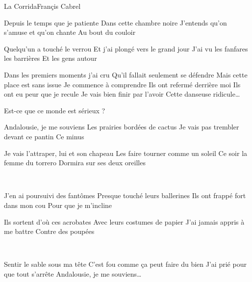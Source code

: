 \documentclass[a4paper,11pt,french]{article}
\begin{document}

\begin{Song}[Corrida]{La Corrida}{Françis Cabrel}
\begin{multicols}{2}

\begin{Verse}
Depuis le temps que je patiente
Dans cette chambre noire
J'entends qu'on s'amuse et qu'on chante
Au bout du couloir
\espaceInterStrophe

Quelqu'un a touché le verrou
Et j'ai plongé vers le grand jour
J'ai vu les fanfares les barrières
Et les gens autour
\end{Verse}
\espaceInterStrophe

\begin{Verse}
Dans les premiers moments j'ai cru
Qu'il fallait seulement se défendre
Mais cette place est sans issue
Je commence à comprendre
Ils ont refermé derrière moi
Ils ont eu peur que je recule
Je vais bien finir par l'avoir
Cette danseuse ridicule\dots
\end{Verse}
\espaceInterStrophe

\begin{Chorus}
Est-ce que ce monde est sérieux ? \bis
\end{Chorus}
\espaceInterStrophe

\begin{Verse}
Andalousie, je me souviens
Les prairies bordées de cactus
Je vais pas trembler devant ce pantin
Ce minus
\espaceInterStrophe

Je vais l'attraper, lui et son chapeau
Les faire tourner comme un soleil
Ce soir la femme du torrero
Dormira sur ses deux oreilles
\end{Verse}
\espaceInterStrophe

\aurefrain\\
\espaceInterStrophe

\begin{Bridge}
J'en ai poursuivi des fantômes
Presque touché leurs ballerines
Ils ont frappé fort dans mon cou
Pour que je m'incline
\espaceInterStrophe

Ils sortent d'où ces acrobates
Avec leurs costumes de papier
J'ai jamais appris à me battre
Contre des poupées
\end{Bridge}
\espaceInterStrophe

\aurefrain\\
\espaceInterStrophe

\begin{Verse}
Sentir le sable sous ma tête
C'est fou comme ça peut faire du bien
J'ai prié pour que tout s'arrête
Andalousie, je me souviens\dots
\espaceInterStrophe


\end{Verse}
\end{multicols}
\end{Song}
\end{document}
